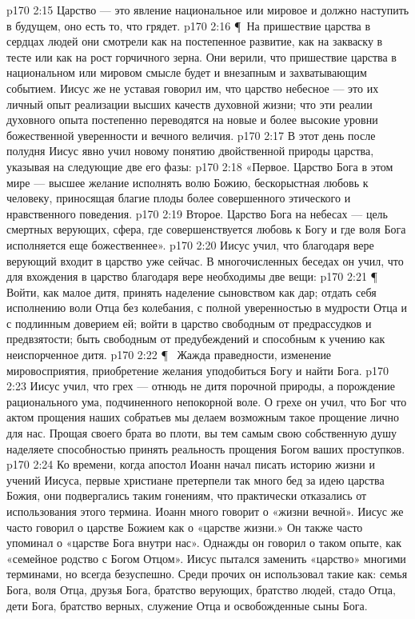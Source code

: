 \vs p170 2:15 \bibnobreakspace Царство --- это явление национальное или мировое и должно наступить в будущем, оно есть то, что грядет.
\vs p170 2:16 \P\ На пришествие царства в сердцах людей они смотрели как на постепенное развитие, как на закваску в тесте или как на рост горчичного зерна. Они верили, что пришествие царства в национальном или мировом смысле будет и внезапным и захватывающим событием. Иисус же не уставая говорил им, что царство небесное --- это их личный опыт реализации высших качеств духовной жизни; что эти реалии духовного опыта постепенно переводятся на новые и более высокие уровни божественной уверенности и вечного величия.
\vs p170 2:17 В этот день после полудня Иисус явно учил новому понятию двойственной природы царства, указывая на следующие две его фазы:
\vs p170 2:18 «Первое. Царство Бога в этом мире --- высшее желание исполнять волю Божию, бескорыстная любовь к человеку, приносящая благие плоды более совершенного этического и нравственного поведения.
\vs p170 2:19 Второе. Царство Бога на небесах --- цель смертных верующих, сфера, где совершенствуется любовь к Богу и где воля Бога исполняется еще божественнее».
\vs p170 2:20 Иисус учил, что благодаря вере верующий входит в царство уже сейчас. В многочисленных беседах он учил, что для вхождения в царство благодаря вере необходимы две вещи:
\vs p170 2:21 \P\ \bibnobreakspace {} Войти, как малое дитя, принять наделение сыновством как дар; отдать себя исполнению воли Отца без колебания, с полной уверенностью в мудрости Отца и с подлинным доверием ей; войти в царство свободным от предрассудков и предвзятости; быть свободным от предубеждений и способным к учению как неиспорченное дитя.
\vs p170 2:22 \P\ \bibnobreakspace {} Жажда праведности, изменение мировосприятия, приобретение желания уподобиться Богу и найти Бога.
\vs p170 2:23 Иисус учил, что грех --- отнюдь не дитя порочной природы, а порождение рационального ума, подчиненного непокорной воле. О грехе он учил, что Бог  что актом прощения наших собратьев мы делаем возможным такое прощение лично для нас. Прощая своего брата во плоти, вы тем самым свою собственную душу наделяете способностью принять реальность прощения Богом ваших проступков.
\vs p170 2:24 Ко времени, когда апостол Иоанн начал писать историю жизни и учений Иисуса, первые христиане претерпели так много бед за идею царства Божия, они подвергались таким гонениям, что практически отказались от использования этого термина. Иоанн много говорит о «жизни вечной». Иисус же часто говорил о царстве Божием как о «царстве жизни.» Он также часто упоминал о «царстве Бога внутри нас». Однажды он говорил о таком опыте, как «семейное родство с Богом Отцом». Иисус пытался заменить «царство» многими терминами, но всегда безуспешно. Среди прочих он использовал такие как: семья Бога, воля Отца, друзья Бога, братство верующих, братство людей, стадо Отца, дети Бога, братство верных, служение Отца и освобожденные сыны Бога.
